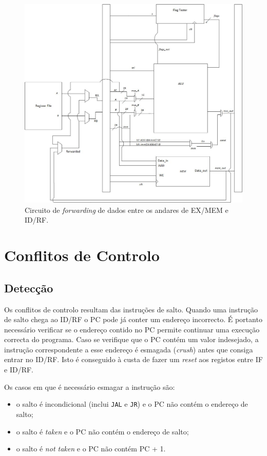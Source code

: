 \documentclass[a4paper]{article}
\begin{document}
	\begin{figure}[h]
			\centering
			\includegraphics[width=1.\textwidth]{img/circuit_data_forwarding}
			\caption{Circuito de \textit{forwarding} de dados entre os andares de EX/MEM e ID/RF.}
			\label{fig:circuit_data_forwarding}
		\end{figure}
	
	\section{Conflitos de Controlo}
	
	\subsection{Detecção}
	
	Os conflitos de controlo resultam das instruções de salto. Quando uma instrução de salto chega ao ID/RF o PC pode já conter um endereço incorrecto. É portanto necessário verificar se o endereço contido no PC permite continuar uma execução correcta do programa. Caso se verifique que o PC contém um valor indesejado, a instrução correspondente a esse endereço é esmagada (\textit{crush}) antes que consiga entrar no ID/RF. Isto é conseguido à custa de fazer um \textit{reset} aos registos entre IF e ID/RF.
	
	Os casos em que é necessário esmagar a instrução são:
	
	\begin{itemize}
		\item o salto é incondicional (inclui  \texttt{JAL} e \texttt{JR}) e o PC não contém o endereço de salto;
		\item o salto é \textit{taken} e o PC não contém o endereço de salto;
		\item o salto é \textit{not taken} e o PC não contém PC + 1.
	\end{itemize}
\end{document}
